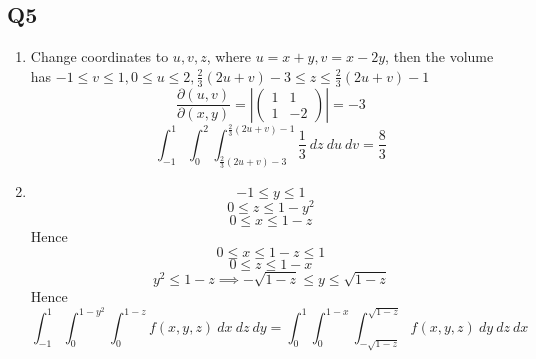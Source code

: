 \documentclass{article}
\newcommand{\p}[2]{\frac{\partial #1}{\partial #2}}
\newcommand{\abs}[1]{\left| #1 \right|}
\begin{document}
\subsection*{Q5}

\begin{enumerate}[label=\alph*.]
\item Change coordinates to $u,v,z$, where $u=x+y, v=x-2y$, then the volume has $-1 \leq v \leq 1, 0 \leq u \leq 2, \frac{2}{3}(2u+v) -3 \leq z \leq \frac{2}{3}(2u+v) -1$
\[\p{(u,v)}{(x,y)} = \abs{\begin{pmatrix}
1 & 1 \\ 1 & -2
\end{pmatrix}} = -3\]
\[
\int_{-1}^1 \int_0^2 \int_{\frac{2}{3}(2u+v)-3}^{\frac{2}{3}(2u+v) -1} \frac{1}{3}\ dz\ du\ dv = \frac{8}{3}
\]

\item
\[-1 \leq y \leq 1\]
\[0 \leq z \leq 1-y^2\]
\[0 \leq x \leq 1-z\]
Hence
\[0 \leq x \leq 1-z \leq 1\]
\[0 \leq z \leq 1-x\]
\[y^2 \leq 1-z \implies -\sqrt{1-z} \leq y \leq \sqrt{1-z}\]
Hence
\[\int_{-1}^{1} \int_0^{1-y^2} \int_0^{1-z} f(x,y,z)\ dx\ dz\ dy = \int_0^1 \int_0^{1-x} \int_{-\sqrt{1-z}}^{\sqrt{1-z}} f(x,y,z)\ dy\ dz\ dx\]
\end{enumerate}
\end{document}
